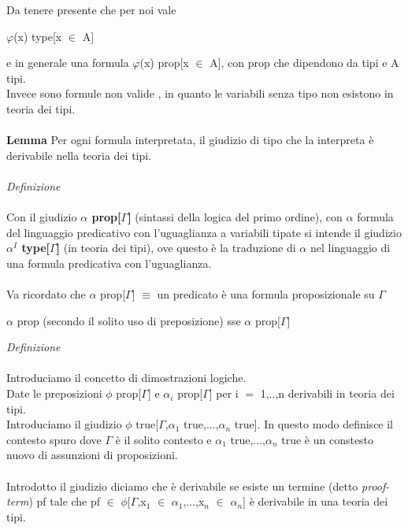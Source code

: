 \noindent
Da tenere presente che per noi vale
\begin{center}$\varphi$(x) type[x $\in$ A]\end{center}
e in generale una formula $\varphi$(x) prop[x $\in$ A], con prop che dipendono da tipi e A tipi.\\
Invece sono formule non valide
 , 
in quanto le variabili senza tipo non esistono in teoria dei tipi.\\\\
\noindent
\textbf{Lemma} Per ogni formula interpretata, il giudizio di tipo che la interpreta \`e derivabile nella teoria dei tipi.\\\\
\noindent
\textit{Definizione}\\\\
\noindent
Con il giudizio \textbf{$\alpha$ prop[$\Gamma$]} (sintassi della logica del primo ordine), con $\alpha$ formula del linguaggio predicativo con l'uguaglianza a variabili tipate
si intende il giudizio \textbf{$\alpha^I$ type[$\Gamma$]} (in teoria dei tipi), ove questo \`e la traduzione di $\alpha$ nel linguaggio di una formula predicativa con l'uguaglianza.\\\\
\noindent
Va ricordato che $\alpha$ prop[$\Gamma$] $\equiv$ un predicato \`e una formula proposizionale su $\Gamma$
\begin{center}
$\alpha$ prop (secondo il solito uso di preposizione) \quad sse \quad $\alpha$ prop[$\Gamma$]
\end{center}
\textit{Definizione}\\\\
\noindent
Introduciamo il concetto di dimostrazioni logiche.\\
Date le preposizioni $\phi$ prop[$\Gamma$] e $\alpha_i$ prop[$\Gamma$] per i $=$ 1,..,n derivabili in teoria dei tipi.\\
Introduciamo il giudizio $\phi$ true[$\Gamma$,$\alpha_1$ true,...,$\alpha_n$ true]. In questo modo definisce il contesto spuro dove $\Gamma$ \`e il solito contesto e $\alpha_1$ true,...,$\alpha_n$ true \`e un constesto nuovo di assunzioni di proposizioni.\\\\
\noindent
Introdotto il giudizio diciamo che \`e derivabile se esiste un termine (detto \textit{proof-term}) pf tale che pf $\in$ $\phi$[$\Gamma$,x$_1$ $\in$ $\alpha_1$,...,x$_n$ $\in$ $\alpha_n$] \`e derivabile in una teoria dei tipi.\\\\

